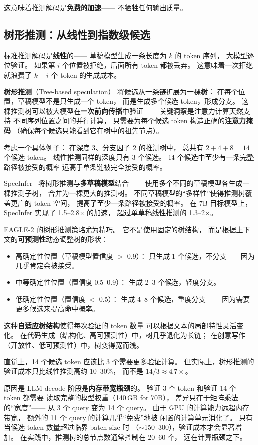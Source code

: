 这意味着推测解码是\textbf{免费的加速}——
不牺牲任何输出质量。

\subsection{树形推测：从线性到指数级候选}

标准推测解码是\textbf{线性}的——
草稿模型生成一条长度为 $k$ 的 token 序列，
大模型逐位验证。
如果第 $i$ 个位置被拒绝，后面所有 token 都被丢弃。
这意味着一次拒绝就浪费了 $k - i$ 个 token 的生成成本。

\textbf{树形推测}（Tree-based speculation）
将候选从一条链扩展为一棵\textbf{树}：
在每个位置，草稿模型不是只生成一个 token，
而是生成多个候选 token，形成分支。
这棵推测树可以被大模型在\textbf{一次前向传播}中验证——
关键洞察是注意力计算天然支持
不同序列位置之间的并行计算，
只需要为每个候选 token 构造正确的\textbf{注意力掩码}
（确保每个候选只能看到它在树中的祖先节点）。

考虑一个具体例子：
在深度 3、分支因子 2 的推测树中，
总共有 $2 + 4 + 8 = 14$ 个候选 token。
线性推测同样的深度只有 3 个候选。
14 个候选中至少有一条完整路径被接受的概率
远高于单条链被完全接受的概率。

SpecInfer~\cite{miao2024specinfer}
将树形推测与\textbf{多草稿模型}结合——
使用多个不同的草稿模型各生成一棵推测子树，
合并为一棵更大的推测树。
不同草稿模型的``多样性''使得推测树覆盖更广的 token 空间，
提高了至少一条路径被接受的概率。
在 7B 目标模型上，SpecInfer 实现了 1.5--2.8$\times$ 的加速，
超过单草稿线性推测的 1.3--2$\times$。

EAGLE-2 的树形推测策略尤为精巧。
它不是使用固定的树结构，
而是根据上下文的\textbf{可预测性}动态调整树的形状：
\begin{itemize}[noitemsep]
  \item 高确定性位置（草稿模型置信度 $>$ 0.9）：
        只生成 1 个候选，不分支——因为几乎肯定会被接受。
  \item 中等确定性位置（置信度 0.5--0.9）：
        生成 2--3 个候选，轻度分支。
  \item 低确定性位置（置信度 $<$ 0.5）：
        生成 4--8 个候选，重度分支——
        因为需要更多候选来提高命中概率。
\end{itemize}
这种\textbf{自适应树结构}使得每次验证的 token 数量
可以根据文本的局部特性灵活变化。
在代码生成（结构化、高可预测性）中，树几乎退化为长链；
在创意写作（开放性、低可预测性）中，树变得宽而浅。

\begin{whybox}[树形推测为什么不需要更多的验证计算？]
直觉上，14 个候选 token 应该比 3 个需要更多验证计算。
但实际上，树形推测的验证成本只比线性推测高约 10--30\%，
而不是 $14/3 \approx 4.7\times$。

原因是 LLM decode 阶段是\textbf{内存带宽瓶颈}的。
验证 3 个 token 和验证 14 个 token 都需要
读取完整的模型权重（140\,GB for 70B），
差异只在于矩阵乘法的``宽度''——
从 3 个 query 变为 14 个 query。
由于 GPU 的计算能力远超内存带宽，
额外的 11 个 query 的计算几乎``免费''地被
闲置的计算单元消化了。
只有当候选 token 数量超过临界 batch size 时
（$\sim$150--300），验证成本才会显著增加。
在实践中，推测树的总节点数通常控制在 20--60 个，
远在计算瓶颈之下。
\end{whybox}

